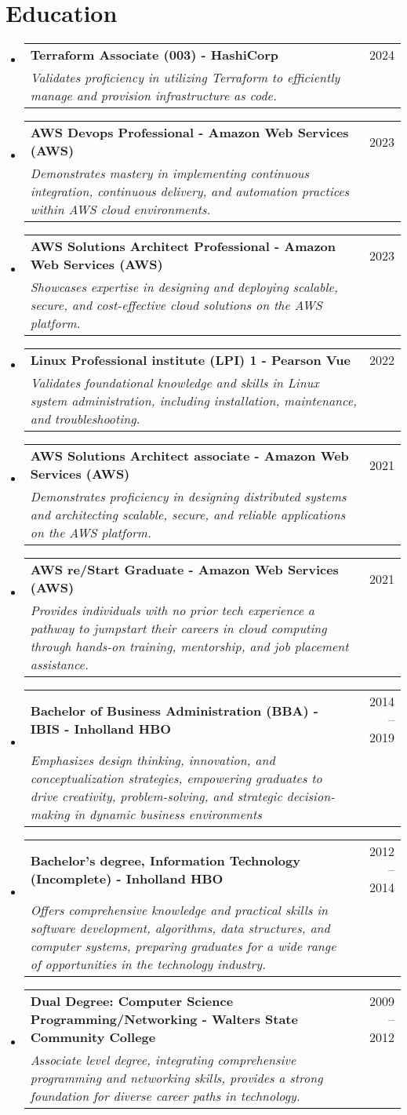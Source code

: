 \documentclass[letterpaper,11pt]{article}
\makeatletter
\newcommand{\resumeSubheading}[4]{
  \vspace{-2pt}\item
    \begin{tabular*}{0.97\textwidth}[t]{l@{\extracolsep{\fill}}r}
      \textbf{#1} & #2 \\
      \textit{\small#3} & \textit{\small #4} \\
    \end{tabular*}\vspace{-7pt}
}
\newcommand{\resumeSubHeadingListStart}{\begin{itemize}[leftmargin=0.15in, label={}]}
\newcommand{\resumeSubHeadingListEnd}{\end{itemize}}
\makeatother
\begin{document}
\section{Education}
  \resumeSubHeadingListStart
    \resumeSubheading
      {Terraform Associate (003) - HashiCorp}{2024}
      {Validates proficiency in utilizing Terraform to efficiently manage and provision infrastructure as code.}{}
    \resumeSubheading
      {AWS Devops Professional - Amazon Web Services (AWS)}{2023}
      {Demonstrates mastery in implementing continuous integration, continuous delivery, and automation practices within AWS cloud environments.}{}
    \resumeSubheading
      {AWS Solutions Architect Professional - Amazon Web Services (AWS)}{2023}
      {Showcases expertise in designing and deploying scalable, secure, and cost-effective cloud solutions on the AWS platform.}{}
    \resumeSubheading
      {Linux Professional institute (LPI) 1 - Pearson Vue}{2022}
      {Validates foundational knowledge and skills in Linux system administration, including installation, maintenance, and troubleshooting.}{}
    \resumeSubheading
      {AWS Solutions Architect associate - Amazon Web Services (AWS)}{2021}
      {Demonstrates proficiency in designing distributed systems and architecting scalable, secure, and reliable applications on the AWS platform.}{}
    \resumeSubheading
      {AWS re/Start Graduate - Amazon Web Services (AWS)}{2021}
      {Provides individuals with no prior tech experience a pathway to jumpstart their careers in cloud computing through hands-on training, mentorship, and job placement assistance.}{}
    \resumeSubheading
      {Bachelor of Business Administration (BBA) - IBIS - Inholland HBO}{2014 -- 2019}
      {Emphasizes design thinking, innovation, and conceptualization strategies, empowering graduates to drive creativity, problem-solving, and strategic decision-making in dynamic business environments}{}
    \resumeSubheading
      {Bachelor's degree, Information Technology (Incomplete) - Inholland HBO}{2012 -- 2014}
      {Offers comprehensive knowledge and practical skills in software development, algorithms, data structures, and computer systems, preparing graduates for a wide range of opportunities in the technology industry.}{}
    \resumeSubheading
      {Dual Degree: Computer Science Programming/Networking - Walters State Community College }{2009 -- 2012}
      {Associate level degree, integrating comprehensive programming and networking skills, provides a strong foundation for diverse career paths in technology.}{}
  \resumeSubHeadingListEnd
\end{document}
